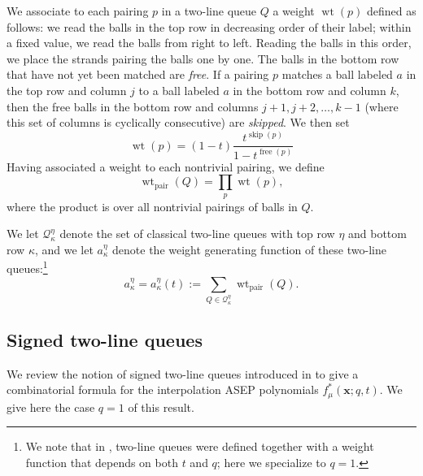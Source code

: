 \documentclass[12pt]{amsart}
\theoremstyle{definition}
\newcommand{\bfx}{\boldsymbol{x}}
\DeclareMathOperator{\wt}{wt}
\DeclareMathOperator{\skipped}{skip}
\DeclareMathOperator{\free}{free}
\DeclareMathOperator{\pair}{pair}
\begin{document}
We associate to each pairing $p$ in a two-line queue $Q$ a weight $\wt(p)$ defined as follows: we read the balls in the top row in decreasing order of  their label; within a fixed  value, we read the balls from right to left.  Reading the balls in this order, we place the strands pairing the balls one by one.  The balls in the bottom row that have not yet been matched  are \emph{free}.  If a pairing $p$ matches a ball labeled $a$ in the top row and column $j$ to a ball labeled $a$ in the bottom row and column $k$, then the free balls in the bottom row and columns $j+1,j+2,\dots,k-1$ (where this set of columns is cyclically consecutive)
are  \emph{skipped}.  We then set 
\begin{equation}
\wt(p) = 
         (1-t) \frac{t^{\skipped(p)}}{1-t^{\free(p)}} 
\end{equation}
Having associated a weight to each nontrivial pairing,
we define $$\wt_{\pair}(Q) = \prod_p \wt(p),$$
where the product is over all nontrivial pairings of balls in $Q$.

We let  $\mathcal{Q}_\kappa^\eta$ denote the set of 
classical two-line queues with top row $\eta$ and bottom row $\kappa$, and we let
$a^\eta_{\kappa}$  
denote  the weight generating function of these two-line queues:\footnote{We note that in \cite{CorteelMandelshtamWilliams2022}, 
two-line queues were defined together with a weight function that depends on both $t$ and $q$; here we specialize to $q=1$.}
\begin{equation}\label{eq:generating_function0}
    a_\kappa^\eta=a_\kappa^\eta(t):=\sum_{Q\in\mathcal{Q}_\kappa^\eta}\wt_{\pair}(Q).
\end{equation}

\subsection{Signed two-line queues}


We review the notion of signed two-line queues introduced in \cite{BenDaliWilliams2025} to give a combinatorial formula for the interpolation ASEP polynomials $f^*_\mu(\bfx;q,t)$. We give here the case $q=1$ of this result.
\end{document}
